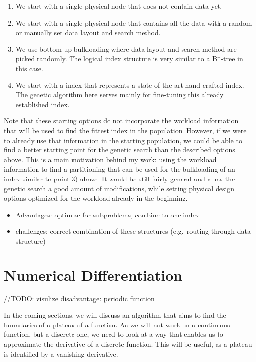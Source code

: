 \begin{enumerate}
    \item We start with a single physical node that does not contain data yet.
    \item We start with a single physical node that contains all the data with a random or manually set data layout and search method.
    \item We use bottom-up bulkloading where data layout and search method are picked randomly. The logical index structure is very similar to a B$^+$-tree in this case.
    \item We start with a index that represents a state-of-the-art hand-crafted index. The genetic algorithm here serves mainly for fine-tuning this already established index.
\end{enumerate}
\noindent Note that these starting options do not incorporate the workload information that will be used to find the fittest index in the population. However, if we were to already use that information in the starting population, we could be able to find a better starting point for the genetic search than the described options above. This is a main motivation behind my work: using the workload information to find a partitioning that can be used for the bulkloading of an index similar to point 3) above. It would be still fairly general and allow the genetic search a good amount of modifications, while setting physical design options optimized for the workload already in the beginning.

\begin{itemize}
    \item Advantages: optimize for subproblems, combine to one index
    \item challenges: correct combination of these structures (e.g.~routing through data structure)
\end{itemize}


\section{Numerical Differentiation}\label{bg:numerical}
//TODO: visulize disadvantage: periodic function

In the coming sections, we will discuss an algorithm that aims to find the boundaries of a plateau of a function. As we will not work on a continuous function, but a discrete one, we need to look at a way that enables us to approximate the derivative of a discrete function. This will be useful, as a plateau is identified by a vanishing derivative.

